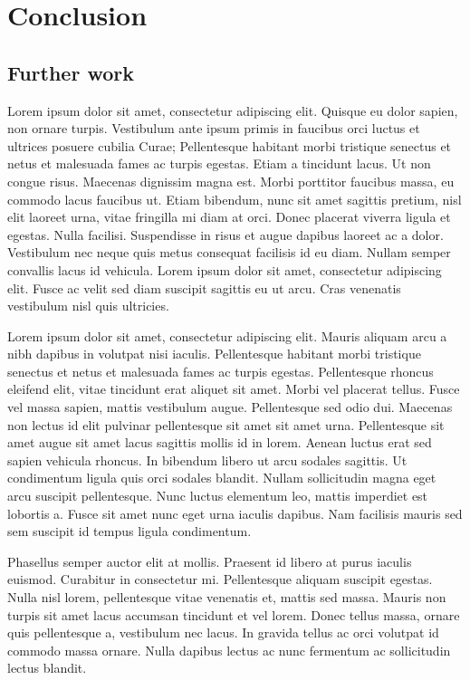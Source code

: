 \chapter{Conclusion}
\label{chap:conclusion}


\section{Further work}

Lorem ipsum dolor sit amet, consectetur adipiscing elit. Quisque eu dolor sapien, non ornare turpis. Vestibulum ante ipsum primis in faucibus orci luctus et ultrices posuere cubilia Curae; Pellentesque habitant morbi tristique senectus et netus et malesuada fames ac turpis egestas. Etiam a tincidunt lacus. Ut non congue risus. Maecenas dignissim magna est. Morbi porttitor faucibus massa, eu commodo lacus faucibus ut. Etiam bibendum, nunc sit amet sagittis pretium, nisl elit laoreet urna, vitae fringilla mi diam at orci. Donec placerat viverra ligula et egestas. Nulla facilisi. Suspendisse in risus et augue dapibus laoreet ac a dolor. Vestibulum nec neque quis metus consequat facilisis id eu diam. Nullam semper convallis lacus id vehicula. Lorem ipsum dolor sit amet, consectetur adipiscing elit. Fusce ac velit sed diam suscipit sagittis eu ut arcu. Cras venenatis vestibulum nisl quis ultricies.

Lorem ipsum dolor sit amet, consectetur adipiscing elit. Mauris aliquam arcu a nibh dapibus in volutpat nisi iaculis. Pellentesque habitant morbi tristique senectus et netus et malesuada fames ac turpis egestas. Pellentesque rhoncus eleifend elit, vitae tincidunt erat aliquet sit amet. Morbi vel placerat tellus. Fusce vel massa sapien, mattis vestibulum augue. Pellentesque sed odio dui. Maecenas non lectus id elit pulvinar pellentesque sit amet sit amet urna. Pellentesque sit amet augue sit amet lacus sagittis mollis id in lorem. Aenean luctus erat sed sapien vehicula rhoncus. In bibendum libero ut arcu sodales sagittis. Ut condimentum ligula quis orci sodales blandit. Nullam sollicitudin magna eget arcu suscipit pellentesque. Nunc luctus elementum leo, mattis imperdiet est lobortis a. Fusce sit amet nunc eget urna iaculis dapibus. Nam facilisis mauris sed sem suscipit id tempus ligula condimentum.

Phasellus semper auctor elit at mollis. Praesent id libero at purus iaculis euismod. Curabitur in consectetur mi. Pellentesque aliquam suscipit egestas. Nulla nisl lorem, pellentesque vitae venenatis et, mattis sed massa. Mauris non turpis sit amet lacus accumsan tincidunt et vel lorem. Donec tellus massa, ornare quis pellentesque a, vestibulum nec lacus. In gravida tellus ac orci volutpat id commodo massa ornare. Nulla dapibus lectus ac nunc fermentum ac sollicitudin lectus blandit.

